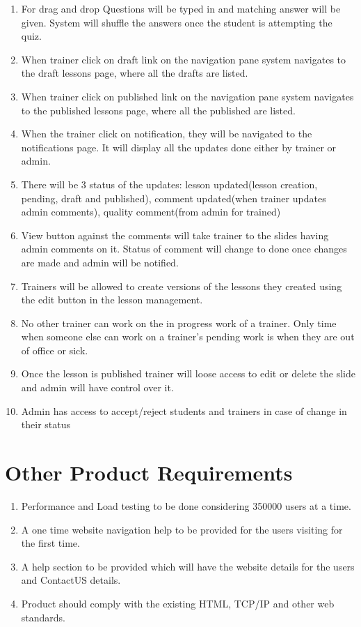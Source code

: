 \documentclass{report}
\begin{document}
\begin{enumerate}
    \item For drag and drop Questions will be typed in and matching answer will be given. System will shuffle the answers once the student is attempting the quiz.
    \item When trainer click on draft link on the navigation pane system navigates to the draft lessons page, where all the drafts are listed.
    \item When trainer click on published link on the navigation pane system navigates to the published lessons page, where all the published are listed.
    \item When the trainer click on notification, they will be navigated to the notifications page. It will display all the updates done either by trainer or admin.
    \item There will be 3 status of the updates: lesson updated(lesson creation, pending, draft and published), comment updated(when trainer updates admin comments), quality comment(from admin for trained)
    \item View button against the comments will take trainer to the slides having admin comments on it. Status of comment will change to done once changes are made and admin will be notified.
    \item Trainers will be allowed to create versions of the lessons they created using the edit button in the lesson management.
    \item No other trainer can work on the in progress work of a trainer. Only time when someone else can work on a trainer's pending work is when they are out of office or sick.
    \item Once the lesson is published trainer will loose access to edit or delete the slide and admin will have control over it.
    \item Admin has access to accept/reject students and trainers in case of change in their status
    
\end{enumerate}

\section{Other Product Requirements}
\begin{enumerate}
    \item Performance and Load testing to be done considering 350000 users at a time.
    \item A one time website navigation help to be provided for the users visiting for the first time.
    \item A help section to be provided which will have the website details for the users and ContactUS details.
    \item Product should comply with the existing HTML, TCP/IP and other web standards. 
\end{enumerate}
\end{document}
